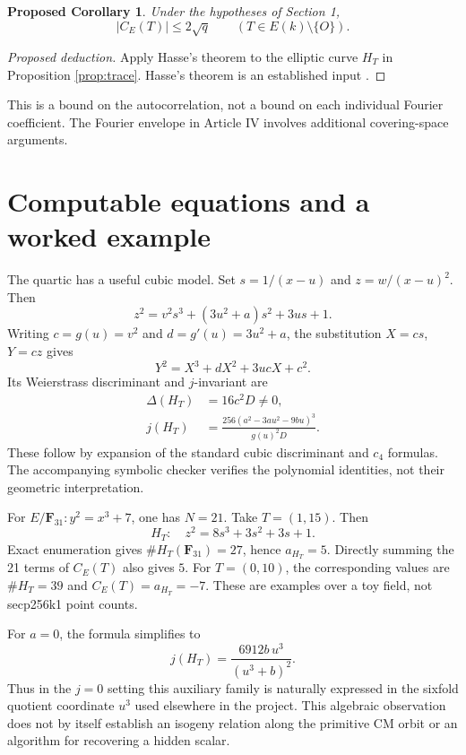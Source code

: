 \documentclass[11pt,a4paper]{article}
\numberwithin{equation}{section}
\newtheorem{cor}[prop]{Proposed Corollary}
\newcommand{\F}{\mathbf F}
\begin{document}
\begin{cor}\label{cor:bound}
Under the hypotheses of Section 1,
\begin{equation}\label{eq:autobound}
 |C_E(T)|\le2\sqrt q\qquad(T\in E(k)\setminus\{O\}).
\end{equation}
\end{cor}
\begin{proof}[Proposed deduction]
Apply Hasse's theorem to the elliptic curve $H_T$ in Proposition \ref{prop:trace}. Hasse's theorem is an established input \cite[Theorem 7.3]{Sutherland}.
\end{proof}
This is a bound on the autocorrelation, not a bound on each individual Fourier coefficient. The Fourier envelope in Article IV involves additional covering-space arguments.

\section{Computable equations and a worked example}
The quartic has a useful cubic model. Set $s=1/(x-u)$ and $z=w/(x-u)^2$. Then
\begin{equation}\label{eq:cubic}
 z^2=v^2s^3+(3u^2+a)s^2+3us+1.
\end{equation}
Writing $c=g(u)=v^2$ and $d=g'(u)=3u^2+a$, the substitution $X=cs$, $Y=cz$ gives
\begin{equation}\label{eq:monic}
 Y^2=X^3+dX^2+3ucX+c^2.
\end{equation}
Its Weierstrass discriminant and $j$-invariant are
\begin{align}\label{eq:discriminant}
 \Delta(H_T)&=16c^2D\ne0,\\
 j(H_T)&=\frac{256(a^2-3au^2-9bu)^3}{g(u)^2D}.
\end{align}
These follow by expansion of the standard cubic discriminant and $c_4$ formulas. The accompanying symbolic checker verifies the polynomial identities, not their geometric interpretation.

For $E/\F_{31}:y^2=x^3+7$, one has $N=21$. Take $T=(1,15)$. Then
\begin{equation}
 H_T:\quad z^2=8s^3+3s^2+3s+1.
\end{equation}
Exact enumeration gives $\#H_T(\F_{31})=27$, hence $a_{H_T}=5$. Directly summing the 21 terms of $C_E(T)$ also gives $5$. For $T=(0,10)$, the corresponding values are $\#H_T=39$ and $C_E(T)=a_{H_T}=-7$. These are examples over a toy field, not secp256k1 point counts.

For $a=0$, the formula simplifies to
\begin{equation}\label{eq:cmj}
 j(H_T)=\frac{6912b\,u^3}{(u^3+b)^2}.
\end{equation}
Thus in the $j=0$ setting this auxiliary family is naturally expressed in the sixfold quotient coordinate $u^3$ used elsewhere in the project. This algebraic observation does not by itself establish an isogeny relation along the primitive CM orbit or an algorithm for recovering a hidden scalar.
\end{document}
